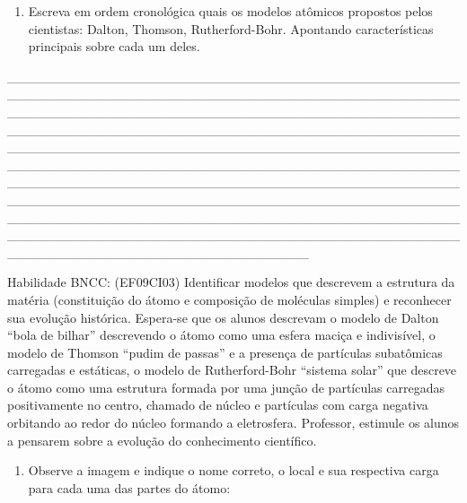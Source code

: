 \begin{enumerate}
\def\labelenumi{\arabic{enumi}.}
\item
  Escreva em ordem cronológica quais os modelos atômicos propostos pelos
  cientistas: Dalton, Thomson, Rutherford-Bohr. Apontando
  características principais sobre cada um deles.
\end{enumerate}

\_\_\_\_\_\_\_\_\_\_\_\_\_\_\_\_\_\_\_\_\_\_\_\_\_\_\_\_\_\_\_\_\_\_\_\_\_\_\_\_\_\_\_\_\_\_\_\_\_\_\_\_\_\_\_\_\_\_\_\_\_\_\_\_\_\_\_\_\_\_\_\_\_\_\_\_\_\_\_\_\_\_\_\_\_\_\_\_\_\_\_\_\_\_\_\_\_\_\_\_\_\_\_\_\_\_\_\_\_\_\_\_\_\_\_\_\_\_\_\_\_\_\_\_\_\_\_\_\_\_\_\_\_\_\_\_\_\_\_\_\_\_\_\_\_\_\_\_\_\_\_\_\_\_\_\_\_\_\_\_\_\_\_\_\_\_\_\_\_\_\_\_\_\_\_\_\_\_\_\_\_\_\_\_\_\_\_\_\_\_\_\_\_\_\_\_\_\_\_\_\_\_\_\_\_\_\_\_\_\_\_\_\_\_\_\_\_\_\_\_\_\_\_\_\_\_\_\_\_\_\_\_\_\_\_\_\_\_\_\_\_\_\_\_\_\_\_\_\_\_\_\_\_\_\_\_\_\_\_\_\_\_\_\_\_\_\_\_\_\_\_\_\_\_\_\_\_\_\_\_\_\_\_\_\_\_\_\_\_\_\_\_\_\_\_\_\_\_\_\_\_\_\_\_\_\_\_\_\_\_\_\_\_\_\_\_\_\_\_\_\_\_\_\_\_\_\_\_\_\_\_\_\_\_\_\_\_\_\_\_\_\_\_\_\_\_\_\_\_\_\_\_\_\_\_\_\_\_\_\_\_\_\_\_\_\_\_\_\_\_\_\_\_\_\_\_\_\_\_\_\_\_\_\_\_\_\_\_\_\_\_\_\_\_\_\_\_\_\_\_\_\_\_\_\_\_\_\_\_\_\_\_\_\_\_\_\_\_\_\_\_\_\_\_\_\_\_\_\_\_\_\_\_\_\_\_\_\_\_\_\_\_\_\_\_\_\_\_\_\_\_\_\_\_\_\_\_\_\_\_\_\_\_\_\_\_\_\_\_\_\_\_\_\_\_\_\_\_\_\_\_\_\_\_\_\_\_\_\_\_\_\_\_\_\_\_\_\_\_\_\_\_\_\_\_\_\_\_\_\_\_\_

Habilidade BNCC: (EF09CI03) Identificar modelos que descrevem a
estrutura da matéria (constituição do átomo e composição de moléculas
simples) e reconhecer sua evolução histórica. Espera-se que os alunos
descrevam o modelo de Dalton ``bola de bilhar'' descrevendo o átomo como
uma esfera maciça e indivisível, o modelo de Thomson ``pudim de passas''
e a presença de partículas subatômicas carregadas e estáticas, o modelo
de Rutherford-Bohr ``sistema solar'' que descreve o átomo como uma
estrutura formada por uma junção de partículas carregadas positivamente
no centro, chamado de núcleo e partículas com carga negativa orbitando
ao redor do núcleo formando a eletrosfera. Professor, estimule os alunos
a pensarem sobre a evolução do conhecimento científico.

\begin{enumerate}
\def\labelenumi{\arabic{enumi}.}
\item
  Observe a imagem e indique o nome correto, o local e sua respectiva
  carga para cada uma das partes do átomo:
\end{enumerate}

